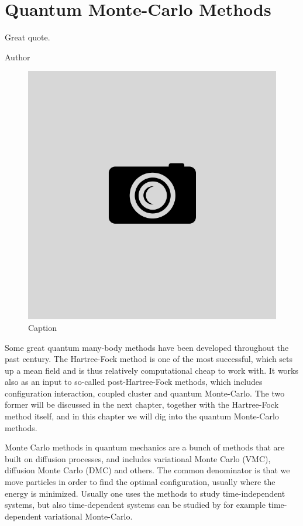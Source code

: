 \chapter{Quantum Monte-Carlo Methods} \label{chp:methods}
\epigraph{Great quote.}{Author}
\begin{figure}[H]
	\centering
	\includegraphics[scale=0.4]{Images/example.png}
	\caption{Caption}
\end{figure}

Some great quantum many-body methods have been developed throughout the past century. The Hartree-Fock method is one of the most successful, which sets up a mean field and is thus relatively computational cheap to work with. It works also as an input to so-called post-Hartree-Fock methods, which includes configuration interaction, coupled cluster and quantum Monte-Carlo. The two former will be discussed in the next chapter, together with the Hartree-Fock method itself, and in this chapter we will dig into the quantum Monte-Carlo methods. 

Monte Carlo methods in quantum mechanics are a bunch of methods that are built on diffusion processes, and includes variational Monte Carlo (VMC), diffusion Monte Carlo (DMC) and others. The common denominator is that we move particles in order to find the optimal configuration, usually where the energy is minimized. Usually one uses the methods to study time-independent systems, but also time-dependent systems can be studied by for example time-dependent variational Monte-Carlo.

